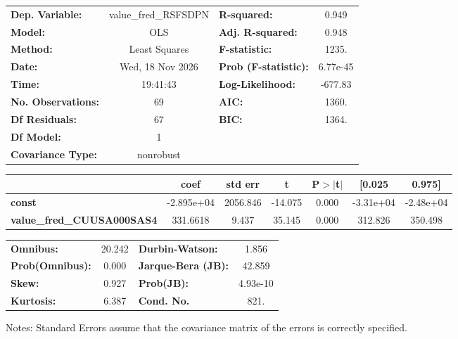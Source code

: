 \begin{center}
\begin{tabular}{lclc}
\toprule
\textbf{Dep. Variable:}            & value\_fred\_RSFSDPN & \textbf{  R-squared:         } &     0.949   \\
\textbf{Model:}                    &         OLS          & \textbf{  Adj. R-squared:    } &     0.948   \\
\textbf{Method:}                   &    Least Squares     & \textbf{  F-statistic:       } &     1235.   \\
\textbf{Date:}                     &   Wed, 18 Nov 2026   & \textbf{  Prob (F-statistic):} &  6.77e-45   \\
\textbf{Time:}                     &       19:41:43       & \textbf{  Log-Likelihood:    } &   -677.83   \\
\textbf{No. Observations:}         &            69        & \textbf{  AIC:               } &     1360.   \\
\textbf{Df Residuals:}             &            67        & \textbf{  BIC:               } &     1364.   \\
\textbf{Df Model:}                 &             1        & \textbf{                     } &             \\
\textbf{Covariance Type:}          &      nonrobust       & \textbf{                     } &             \\
\bottomrule
\end{tabular}
\begin{tabular}{lcccccc}
                                   & \textbf{coef} & \textbf{std err} & \textbf{t} & \textbf{P$> |$t$|$} & \textbf{[0.025} & \textbf{0.975]}  \\
\midrule
\textbf{const}                     &   -2.895e+04  &     2056.846     &   -14.075  &         0.000        &    -3.31e+04    &    -2.48e+04     \\
\textbf{value\_fred\_CUUSA000SAS4} &     331.6618  &        9.437     &    35.145  &         0.000        &      312.826    &      350.498     \\
\bottomrule
\end{tabular}
\begin{tabular}{lclc}
\textbf{Omnibus:}       & 20.242 & \textbf{  Durbin-Watson:     } &    1.856  \\
\textbf{Prob(Omnibus):} &  0.000 & \textbf{  Jarque-Bera (JB):  } &   42.859  \\
\textbf{Skew:}          &  0.927 & \textbf{  Prob(JB):          } & 4.93e-10  \\
\textbf{Kurtosis:}      &  6.387 & \textbf{  Cond. No.          } &     821.  \\
\bottomrule
\end{tabular}
\end{center}

Notes: \newline
 [1] Standard Errors assume that the covariance matrix of the errors is correctly specified.